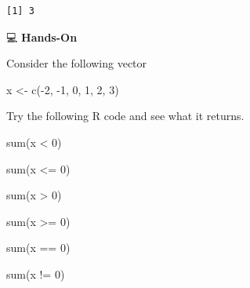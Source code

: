 \documentclass[
  letterpaper,
  DIV=11,
  numbers=noendperiod]{scrreprt}
\newenvironment{Shaded}{\begin{snugshade}}{\end{snugshade}}
\newcommand{\DecValTok}[1]{\textcolor[rgb]{0.68,0.00,0.00}{#1}}
\newcommand{\FunctionTok}[1]{\textcolor[rgb]{0.28,0.35,0.67}{#1}}
\newcommand{\NormalTok}[1]{\textcolor[rgb]{0.00,0.23,0.31}{#1}}
\newcommand{\OtherTok}[1]{\textcolor[rgb]{0.00,0.23,0.31}{#1}}
\newcommand{\SpecialCharTok}[1]{\textcolor[rgb]{0.37,0.37,0.37}{#1}}
\begin{document}
\begin{verbatim}
[1] 3
\end{verbatim}

💻 \textbf{Hands-On}

Consider the following vector

\begin{Shaded}
\begin{Highlighting}[]
\NormalTok{x }\OtherTok{\textless{}{-}} \FunctionTok{c}\NormalTok{(}\SpecialCharTok{{-}}\DecValTok{2}\NormalTok{, }\SpecialCharTok{{-}}\DecValTok{1}\NormalTok{, }\DecValTok{0}\NormalTok{, }\DecValTok{1}\NormalTok{, }\DecValTok{2}\NormalTok{, }\DecValTok{3}\NormalTok{)}
\end{Highlighting}
\end{Shaded}

Try the following R code and see what it returns.

\begin{Shaded}
\begin{Highlighting}[]
\FunctionTok{sum}\NormalTok{(x }\SpecialCharTok{\textless{}} \DecValTok{0}\NormalTok{)}

\FunctionTok{sum}\NormalTok{(x }\SpecialCharTok{\textless{}=} \DecValTok{0}\NormalTok{)}

\FunctionTok{sum}\NormalTok{(x }\SpecialCharTok{\textgreater{}} \DecValTok{0}\NormalTok{)}

\FunctionTok{sum}\NormalTok{(x }\SpecialCharTok{\textgreater{}=} \DecValTok{0}\NormalTok{)}

\FunctionTok{sum}\NormalTok{(x }\SpecialCharTok{==} \DecValTok{0}\NormalTok{)}

\FunctionTok{sum}\NormalTok{(x }\SpecialCharTok{!=} \DecValTok{0}\NormalTok{)}
\end{Highlighting}
\end{Shaded}
\end{document}
